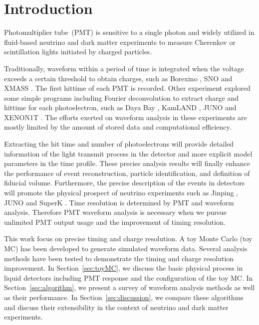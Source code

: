 \section{Introduction} %
\label{sec:introduction}

Photomultiplier tube~(PMT) is sensitive to a single photon and widely utilized in fluid-based neutrino and dark matter experiments to measure Cherenkov or scintillation lights initiated by charged particles.

Traditionally, waveform within a period of time is integrated when the voltage exceeds a certain threshold to obtain charges, such as Borexino \cite{lagomarsino_gateless_1999}, SNO \cite{dunger_event_2019} and XMASS \cite{abe_xmass_2013}. The first hittime of each PMT is recorded. Other experiment explored some simple programs including Fourier deconvolution to extract charge and hittime for each photoelectron, such as Daya Bay \cite{huang_flash_2018}, KamLAND \cite{the_kamland_collaboration_production_2010}, JUNO \cite{zhang_comparison_2019} and XENON1T \cite{aprile_xenon1t_2019}. The efforts exerted on waveform analysis in these experiments are mostly limited by the amount of stored data and computational efficiency. 

Extracting the hit time and number of photoelectrons will provide detailed information of the light transmit process in the detector and more explicit model parameters in the time profile. These precise analysis results will finally enhance the performance of event reconstruction, particle identification, and definition of fiducial volume. Furthermore, the precise description of the events in detectors will promote the physical prospect of neutrino experiments such as Jinping \cite{beacom_physics_2017}, JUNO \cite{an_neutrino_2016} and SuperK \cite{noauthor_super-kamiokande_2003}. Time resolution is determined by PMT and waveform analysis. Therefore PMT waveform analysis is necessary when we pursue unlimited PMT output usage and the improvement of timing resolution. 

This work focus on precise timing and charge resolution. A toy Monte Carlo (toy MC) has been developed to generate simulated waveform data. Several analysis methods have been tested to demonstrate the timing and charge resolution improvement. In Section~\ref{sec:toyMC}, we discuss the basic physical process in liquid detectors including PMT response and the configuration of the toy MC. In Section~\ref{sec:algorithm}, we present a survey of waveform analysis methods as well as their performance. In Section~\ref{sec:discussion}, we compare these algorithms and discuss their extensibility in the context of neutrino and dark matter experiments. 

